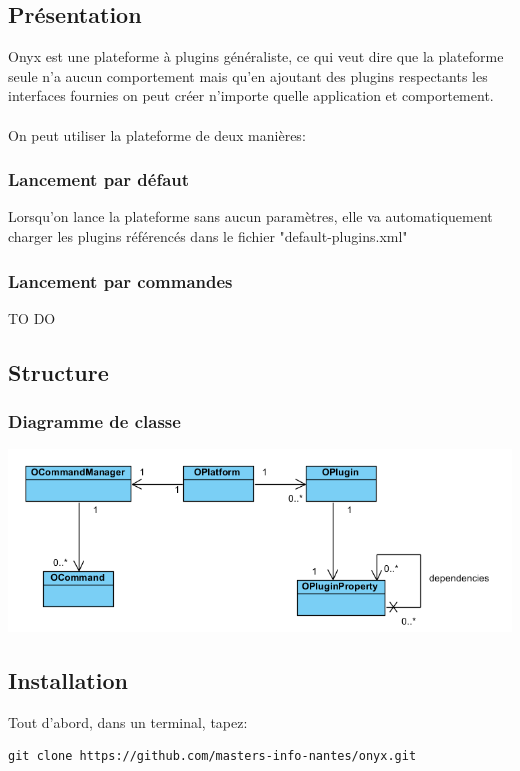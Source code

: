 \subsection{Présentation}

Onyx est une plateforme à plugins généraliste, ce qui veut dire que la plateforme seule n'a aucun comportement mais qu'en ajoutant des plugins respectants les interfaces fournies on peut créer n'importe quelle application et comportement.
\\
\\
On peut utiliser la plateforme de deux manières:


\subsubsection{Lancement par défaut}

Lorsqu'on lance la plateforme sans aucun paramètres, elle va automatiquement charger les plugins référencés dans le fichier "default-plugins.xml"

\subsubsection{Lancement par commandes}

TO DO

\subsection{Structure}

\subsubsection{Diagramme de classe}
\includegraphics[width=15cm]{figures/class_diagram.png}
\newpage
\subsection{Installation}

Tout d’abord, dans un terminal, tapez:
\begin{verbatim}
git clone https://github.com/masters-info-nantes/onyx.git
\end{verbatim}

